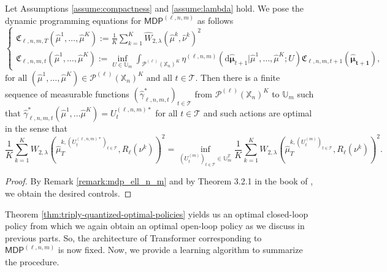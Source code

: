 \documentclass[11pt]{article}
\newcommand{\XX}{\mathbb{X}}
\newcommand{\UU}{\mathbb{U}}
\newcommand{\cP}{\mathcal{P}}
\newcommand{\cT}{\mathcal{T}}
\newcommand{\fC}{\mathfrak{C}}
\newcommand{\de}{\mathrm{d}} %
\begin{document}
\begin{theorem}\label{thm:triply-quantized-optimal-policies}
    Let Assumptions \ref{assume:compactness} and \ref{assume:lambda} hold. We pose the dynamic programming equations for $\mathsf{MDP}^{(\ell,n,m)}$ as follows
    \begin{equation}
        \begin{cases}
            \displaystyle\fC_{\ell,n,m,T}(\hat{\mu}^1,\ldots,\hat{\mu}^K) :=  \frac{1}{K}\sum_{k=1}^K \hat{W}_{2,\lambda}(\hat{\mu}^k,\hat{\nu}^k)^2 \\
            \displaystyle\fC_{\ell,n,m,t}(\hat{\mu}^1,\ldots,\hat{\mu}^K) := \inf_{U\in\UU_m}\int_{\cP^{(\ell)}(\XX_n)^K}\eta^{(\ell,n,m)}(\de\bm{\hat{\mu}}_{t+1}|\hat{\mu}^1,\ldots,\hat{\mu}^K; U)\fC_{\ell,n,m,t+1}(\bm{\hat{\mu}_{t+1}}),
        \end{cases}
    \end{equation}
    $\text{for all } (\hat{\mu}^1,\ldots,\hat{\mu}^K)\in\cP^{(\ell)}(\XX_n)^K \text{ and all } t\in\cT$. Then there is a finite sequence of measurable functions $(\hat{\gamma}^*_{\ell,n,m,t})_{t\in\cT}$ from $\cP^{(\ell)}(\XX_n)^K$ to $\UU_m$ such that $\hat{\gamma}^*_{\ell,n,m,t}(\hat{\mu}^1,\ldots\hat{\mu}^K) = U_t^{(\ell,n,m)*}$ for all $t\in\cT$ and such actions are optimal in the sense that
    \begin{equation}
        \frac{1}{K}\sum_{k=1}^K W_{2,\lambda}(\hat{\mu}_T^{k,(U_t^{(\ell,n,m)*})_{t\in\cT}}, R_\ell(\nu^k))^2 = \inf_{(U_t^{(m)})_{t\in\cT}\in\UU_m^T}\frac{1}{K}\sum_{k=1}^K W_{2,\lambda}(\hat{\mu}_T^{k,(U_t^{(m)})_{t\in\cT}}, R_\ell(\nu^k))^2.
    \end{equation}
\end{theorem}
\begin{proof}
    By Remark \ref{remark:mdp_ell_n_m} and by Theorem 3.2.1 in the book of \cite{hernandez2012discrete}, we obtain the desired controls.
\end{proof}

Theorem \ref{thm:triply-quantized-optimal-policies} yields us an optimal closed-loop policy from which we again obtain an optimal open-loop policy as we discuss in previous parts. So, the architecture of Transformer corresponding to $\mathsf{MDP}^{(\ell,n,m)}$ is now fixed. Now, we provide a learning algorithm to summarize the procedure.
\end{document}
